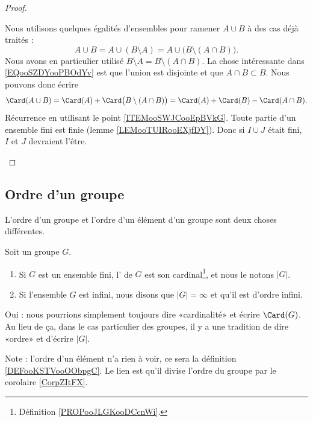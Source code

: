 \begin{proof}
\begin{subproof}
		Nous utilisons quelques égalités d'ensembles pour ramener \( A\cup B\) à des cas déjà traités :
		\begin{equation}        \label{EQooSZDYooPBOdYv}
			A\cup B=A\cup(B\setminus A)=A\cup\big( B\setminus(A\cap B) \big).
		\end{equation}
		Nous avons en particulier utilisé \( B\setminus A=B\setminus(A\cap B)\). La chose intéressante dans \eqref{EQooSZDYooPBOdYv} est que l'union est disjointe et que \( A\cap B\subset B\). Nous pouvons donc écrire
		\begin{equation}
			\Card(A\cup B)=\Card(A)+\Card\big( B\setminus(A\cap B) \big)=\Card(A)+\Card(B)-\Card(A\cap B).
		\end{equation}
		Récurrence en utilisant le point \ref{ITEMooSWJCooEpBVkG}.
		Toute partie d'un ensemble fini est finie (lemme \ref{LEMooTUIRooEXjfDY}). Donc si \( I\cup J\) était fini, \( I\) et \( J\) devraient l'être.
	\end{subproof}
\end{proof}



\subsection{Ordre d'un groupe}


L'ordre d'un groupe et l'ordre d'un élément d'un groupe sont deux choses différentes.

\begin{definition}    \label{DEFooKWBCooMlmpCP}
	Soit un groupe \( G\).
	\begin{enumerate}
		\item
		      Si \( G\) est un ensemble fini, l' de \( G\) est son cardinal\footnote{Définition \ref{PROPooJLGKooDCcnWi}.}, et nous le notons \( | G |\).
		\item
		      Si l'ensemble \( G\) est infini, nous disons que \( | G |=\infty\) et qu'il est d'ordre infini.
	\end{enumerate}
	Oui : nous pourrions simplement toujours dire «cardinalité» et écrire \( \Card(G)\). Au lieu de ça, dans le cas particulier des groupes, il y a une tradition de dire «ordre» et d'écrire \( | G |\).
\end{definition}
Note : l'ordre d'un élément n'a rien à voir, ce sera la définition \ref{DEFooKSTVooOObpgC}. Le lien est qu'il divise l'ordre du groupe par le corolaire \ref{CorpZItFX}.


